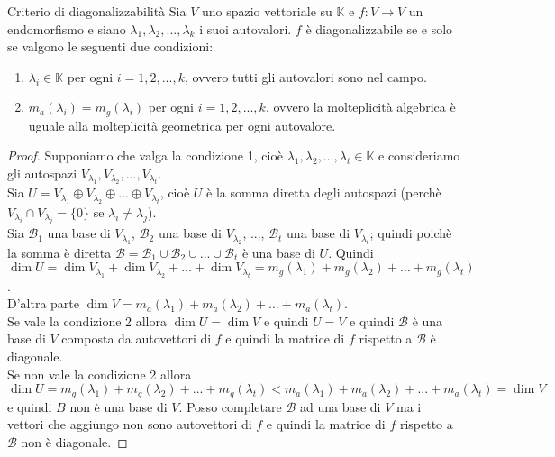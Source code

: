 \documentclass[a4paper]{article}
\theoremstyle{definition}
\begin{document}
	\begin{teo}{Criterio di diagonalizzabilità}{}
		Sia $V$ uno spazio vettoriale su $\mathbb{K}$ e $f: V \to V$ un endomorfismo e siano $\lambda_1, \lambda_2, ..., \lambda_k$ i suoi autovalori.
		$f$ è diagonalizzabile se e solo se valgono le seguenti due condizioni:
		\begin{enumerate}
			\item $\lambda_i \in \mathbb{K}$ per ogni $i = 1, 2, ..., k$, ovvero tutti gli autovalori sono nel campo.
			\item $m_a(\lambda_i) = m_g(\lambda_i)$ per ogni $i = 1, 2, ..., k$, ovvero la molteplicità algebrica è uguale alla molteplicità geometrica per ogni autovalore.
		\end{enumerate}
	\end{teo}

	\begin{proof}
		Supponiamo che valga la condizione 1, cioè $\lambda_1, \lambda_2, ..., \lambda_t \in \mathbb{K}$ e consideriamo gli autospazi $V_{\lambda_1}, V_{\lambda_2}, ..., V_{\lambda_t}$. \\
		Sia $U = V_{\lambda_1} \oplus V_{\lambda_2} \oplus ... \oplus V_{\lambda_t}$, cioè $U$ è la somma diretta degli autospazi (perchè $V_{\lambda_i} \cap V_{\lambda_j} = \{0\}$ se $\lambda_i \ne \lambda_j$). \\
		Sia $\mathcal{B}_1$ una base di $V_{\lambda_1}$, $\mathcal{B}_2$ una base di $V_{\lambda_2}$, ..., $\mathcal{B}_t$ una base di $V_{\lambda_t}$;
		quindi poichè la somma è diretta $\mathcal{B} = \mathcal{B}_1 \cup \mathcal{B}_2 \cup ... \cup \mathcal{B}_t$ è una base di $U$.
		Quindi $\dim U = \dim V_{\lambda_1} + \dim V_{\lambda_2} + ... + \dim V_{\lambda_t} = m_g(\lambda_1) + m_g(\lambda_2) + ... + m_g(\lambda_t)$. \\
		D'altra parte $\dim V = m_a(\lambda_1) + m_a(\lambda_2) + ... + m_a(\lambda_t)$. \\
		Se vale la condizione 2 allora $\dim U = \dim V$ e quindi $U = V$ e quindi $\mathcal{B}$ è una base di $V$ composta da autovettori di $f$ e quindi la matrice di $f$ rispetto a $\mathcal{B}$ è diagonale. \\
		Se non vale la condizione 2 allora $\dim U = m_g(\lambda_1) + m_g(\lambda_2) + ... + m_g(\lambda_t) < m_a(\lambda_1) + m_a(\lambda_2) + ... + m_a(\lambda_t) = \dim V$ e quindi $B$ non è una base di $V$.
		Posso completare $\mathcal{B}$ ad una base di $V$ ma i vettori che aggiungo non sono autovettori di $f$ e quindi la matrice di $f$ rispetto a $\mathcal{B}$ non è diagonale.
	\end{proof}
\end{document}
